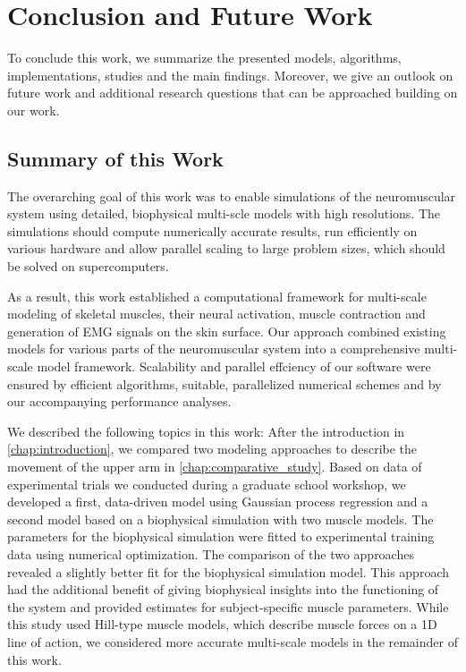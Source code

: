 
\chapter{Conclusion and Future Work}\label{sec:conclusion_and_future_work}
To conclude this work, we summarize the presented models, algorithms, implementations, studies and the main findings. Moreover, we give an outlook on future work and additional research questions that can be approached building on our work.

\section{Summary of this Work}

The overarching goal of this work was to enable simulations of the neuromuscular system using detailed, biophysical multi-scle models with high resolutions. The simulations should compute numerically accurate results, run efficiently on various hardware and allow parallel scaling to large problem sizes, which should be solved on supercomputers.

As a result, this work established a computational framework for multi-scale modeling of skeletal muscles, their neural activation, muscle contraction and generation of EMG signals on the skin surface. Our approach combined existing models for various parts of the neuromuscular system into a comprehensive multi-scale model framework. Scalability and parallel effciency of our software were ensured by efficient algorithms, suitable, parallelized numerical schemes and by our accompanying performance analyses.


We described the following topics in this work: After the introduction in \cref{chap:introduction}, we compared two modeling approaches to describe the movement of the upper arm in \cref{chap:comparative_study}. Based on data of experimental trials we conducted during a graduate school workshop, we developed a first, data-driven model using Gaussian process regression and a second model based on a biophysical simulation with two muscle models. The parameters for the biophysical simulation were fitted to experimental training data using numerical optimization. The comparison of the two approaches revealed a slightly better fit for the biophysical simulation model. This approach had the additional benefit of giving biophysical insights into the functioning of the system and provided estimates for subject-specific muscle parameters. While this study used Hill-type muscle models, which describe muscle forces on a 1D line of action, we considered more accurate multi-scale models in the remainder of this work.

